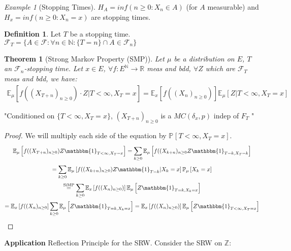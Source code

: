 \documentclass[12pt]{book}
\newtheorem{theorem}{Theorem}[section]
\theoremstyle{definition}
\newtheorem{defn}{Definition}[section]
\theoremstyle{remark}
\newtheorem{ex}{Example}[section]
\begin{document}
\begin{ex}[Stopping Times]
	$H_{A}=inf(n \geq 0: X_n \in  A)$ (for $A$ measurable) and $H_x=inf(n\geq 0: X_n = x)$ are stopping times.
\end{ex}

\begin{defn}
	Let $T$ be a stopping time. $ \mathcal{F}_T=\{A \in \mathcal{F}: \forall n \in \mathbb{N}: \{T=n\}\cap A \in \mathcal{F}_n \}$
\end{defn}

\begin{theorem}[Strong Markov Property (SMP)]
	Let $\mu $ be a distribution on $E$, $T$ an $ \mathcal{F}_n$-stopping time. Let $x \in E$,
	$\forall f:E^{\mathbb{N}} \to \mathbb{R}$ meas and bdd, $\forall Z$ which are $ \mathcal{F}_T$ meas and bdd, we have:
\begin{align}
	\mathbb{E}_{\mu } \left[ f((X_{T+n})_{n\geq 0}) \cdot Z | T<\infty, X_T=x \right] = \mathbb{E}_{x} \left[ f((X_n)_{n\geq 0}) \right]  \mathbb{E}_{\mu } \left[ Z | T<\infty, X_T=x \right] 
\end{align}

\end{theorem}
\noindent
"Conditioned on $\{T<\infty,X_T=x\}$, $(X_{T+n})_{n\geq 0}$ is a $MC(\delta_x,p)$ indep of $F_T$ "
\begin{proof}
We will multiply each side of the equation by $\mathbb{P}_{} \left[ T < \infty, X_T =x \right]$.
\begin{gather}
	\mathbb{E}_{\mu } \left[ f((X_{T+n})_{n\geq 0})Z \mathbbm{1}_{T<\infty, X_T=x}  \right] = \sum_{k\geq 0}^{} \mathbb{E}_{\mu } \left[ f((X_{k+n})_{n\geq 0} Z \mathbbm{1}_{T=k, X_T=k}  \right] \\
	= \sum_{k\geq 0}^{} \mathbb{E}_{\mu } \left[ f((X_{k+n})_{n\geq 0}) Z \mathbbm{1}_{T=k} | X_k = x \right] \mathbb{P}_{\mu } \left[ X_k = x  \right] \\ 
	\stackrel{\text{SiMP}}{=} \sum_{k\geq 0}^{} \mathbb{E}_{x} \left[ f((X_{n})_{n\geq 0}) \right] \mathbb{E}_{\mu } \left[ Z \mathbbm{1}_{T=k, X_k = x}  \right] \\
	= \mathbb{E}_{x} \left[ f((X_n)_{n\geq 0} \right] \sum_{k\geq 0}^{} \mathbb{E}_{\mu } \left[ Z \mathbbm{1}_{T=k, X_k=x}  \right]  
	= \mathbb{E}_{x} \left[ f((X_n)_{n\geq 0}) \right] \mathbb{E}_{\mu } \left[ Z \mathbbm{1}_{T<\infty, X_T=x}  \right] 
\end{gather}
\end{proof}


\noindent
\textbf{Application} Reflection Principle for the SRW.
Consider the SRW on $\mathbb{Z}$: 
\end{document}
